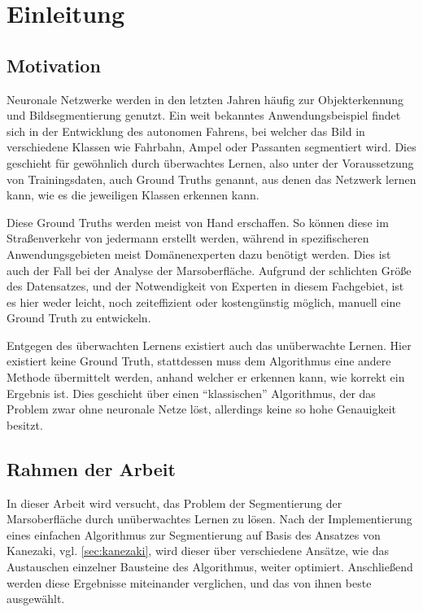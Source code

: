 \chapter{Einleitung}
\label{chap:einleitung}

\section{Motivation}
\label{sec:motivation}

Neuronale Netzwerke werden in den letzten Jahren häufig zur Objekterkennung und Bildsegmentierung genutzt. Ein weit bekanntes Anwendungsbeispiel findet sich in der Entwicklung des autonomen Fahrens, bei welcher das Bild in verschiedene Klassen wie \zB Fahrbahn, Ampel oder Passanten segmentiert wird. Dies geschieht für gewöhnlich durch überwachtes Lernen, also unter der Voraussetzung von Trainingsdaten, auch Ground Truths genannt, aus denen das Netzwerk lernen kann, wie es die jeweiligen Klassen erkennen kann.

Diese Ground Truths werden meist von Hand erschaffen. So können diese im Straßenverkehr von jedermann erstellt werden, während in spezifischeren Anwendungsgebieten meist Domänenexperten dazu benötigt werden. Dies ist auch der Fall bei der Analyse der Marsoberfläche. Aufgrund der schlichten Größe des Datensatzes, und der Notwendigkeit von Experten in diesem Fachgebiet, ist es hier weder leicht, noch zeiteffizient oder kostengünstig möglich, manuell eine Ground Truth zu entwickeln.

Entgegen des überwachten Lernens existiert auch das unüberwachte Lernen. Hier existiert keine Ground Truth, stattdessen muss dem Algorithmus eine andere Methode übermittelt werden, anhand welcher er erkennen kann, wie korrekt ein Ergebnis ist. Dies geschieht \zB über einen \enquote{klassischen} Algorithmus, der das Problem zwar ohne neuronale Netze löst, allerdings keine so hohe Genauigkeit besitzt.

\section{Rahmen der Arbeit}
\label{sec:rahmen}

In dieser Arbeit wird versucht, das Problem der Segmentierung der Marsoberfläche durch unüberwachtes Lernen zu lösen. Nach der Implementierung eines einfachen Algorithmus zur Segmentierung auf Basis des Ansatzes von Kanezaki\cite{kanezaki_18}, vgl. \ref{sec:kanezaki}, wird dieser über verschiedene Ansätze, wie \zB das Austauschen einzelner Bausteine des Algorithmus, weiter optimiert. Anschließend werden diese Ergebnisse miteinander verglichen, und das von ihnen beste ausgewählt.